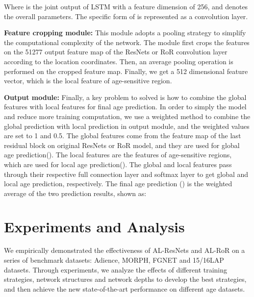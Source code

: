 \documentclass[journal]{IEEEtran}
\begin{document}
Where  is the joint output of LSTM with a feature dimension of 256, and  denotes the overall parameters. The specific form of  is represented as a convolution layer.
\par
\textbf{Feature cropping module:} This module adopts a pooling strategy to simplify the computational complexity of the network. The module first crops the features on the  51277 output feature map of the ResNets or RoR convolution layer according to the location coordinates. Then, an average pooling operation is performed on the cropped feature map. Finally, we get a 512 dimensional feature vector, which is the local feature of age-sensitive region.
\par
\textbf{Output module:} Finally, a key problem to solved is how to combine the global features with local features for final age prediction. In order to simply the model and reduce more training computation, we use a weighted method to combine the global prediction with local prediction in output module, and the weighted values are set to 1 and 0.5. The global features come from the feature map of the last residual block on original ResNets or RoR model, and they are used for global age prediction(). The local features are the features of age-sensitive regions, which are used for local age prediction(). The global and local features pass through their respective full connection layer and softmax layer to get global and local age prediction, respectively. The final age prediction () is the weighted average of the two prediction results, shown as:




\section{Experiments and Analysis}
We empirically demonstrated the effectiveness of AL-ResNets and AL-RoR on a series of benchmark datasets: Adience, MORPH, FGNET and 15/16LAP datasets. Through experiments, we analyze the effects of different training strategies, network structures and network depths to develop the best strategies, and then achieve the new state-of-the-art performance on different age datasets.
\end{document}
